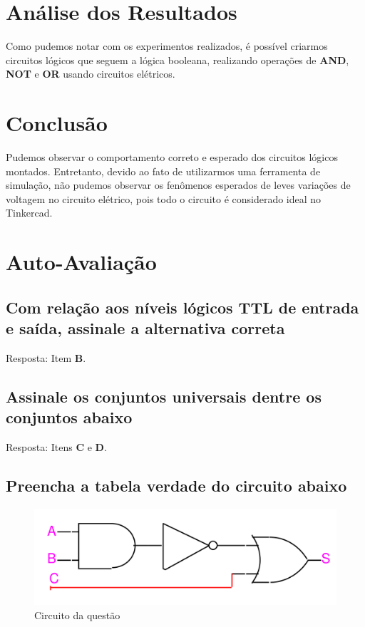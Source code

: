 \documentclass[12pt]{article}
\begin{document}
\section{Análise dos Resultados}
\label{sec:Resultados}

Como pudemos notar com os experimentos realizados, é possível criarmos circuitos
lógicos que seguem a lógica booleana, realizando operações de \textbf{AND},
\textbf{NOT} e \textbf{OR} usando circuitos elétricos.

\section{Conclusão}
\label{sec:Conclusao}

Pudemos observar o comportamento correto e esperado dos circuitos lógicos
montados. Entretanto, devido ao fato de utilizarmos uma ferramenta de simulação,
não pudemos observar os fenômenos esperados de leves variações de voltagem no
circuito elétrico, pois todo o circuito é considerado ideal no Tinkercad.

\nocite{*}



\newpage
\section*{Auto-Avaliação}

\subsection{Com relação aos níveis lógicos TTL de entrada e saída, assinale a
  alternativa correta}
Resposta: Item \textbf{B}.

\subsection{Assinale os conjuntos universais dentre os conjuntos abaixo}
Resposta: Itens \textbf{C} e \textbf{D}.

\subsection{Preencha a tabela verdade do circuito abaixo}
\begin{figure}[H]
    \centering
    \includegraphics[width=.9\textwidth]{exp1_4.3_f1.png}
    \caption{Circuito da questão}
    \label{fig:exp1_4.3_f1}
\end{figure}
\end{document}
